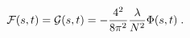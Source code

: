 \begin{equation}\label{result}
  \qquad {\cal F}(s,t) = {\cal G}(s,t)=-\frac{4^2}{8\pi^2}\frac{\lambda}{ N^2}\Phi(s,t) \;.
\end{equation} 
